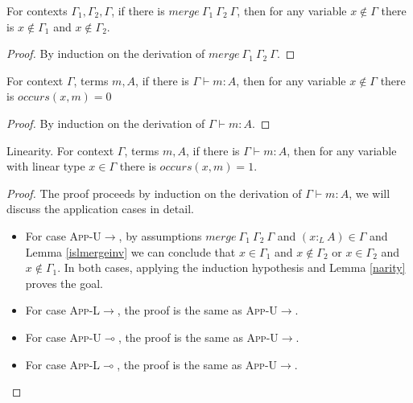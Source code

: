\documentclass[sigplan,screen,review,anonymous]{acmart}
\newcommand{\rname}[1]{\textsc{\footnotesize #1}}
\newcommand{\ltype}{:_{\scriptscriptstyle L}}
\newcommand{\mrg}[3]{merge\ {#1}\ {#2}\ {#3}}
\begin{document}
\begin{lemma}
  For contexts $\Gamma_1, \Gamma_2, \Gamma$, if there is $\mrg{\Gamma_1}{\Gamma_2}{\Gamma}$, then for any variable $x \notin \Gamma$ there is $x \notin \Gamma_1$ and $x \notin \Gamma_2$.
\end{lemma}
\begin{proof}
  By induction on the derivation of $\mrg{\Gamma_1}{\Gamma_2}{\Gamma}$.
\end{proof}

\begin{lemma}\label{narity}
  For context $\Gamma$, terms $m, A$, if there is $\Gamma \vdash m : A$, then for any variable $x \notin \Gamma$ there is $occurs(x, m) = 0$
\end{lemma}
\begin{proof}
  By induction on the derivation of $\Gamma \vdash m : A$.
\end{proof}

\begin{theorem}\label{linearity}
  Linearity. For context $\Gamma$, terms $m, A$, if there is $\Gamma \vdash m : A$, then for any variable with linear type $x \in \Gamma$ there is $occurs(x, m) = 1$.
\end{theorem}
\begin{proof}
  The proof proceeds by induction on the derivation of $\Gamma \vdash m : A$, we will discuss the application cases in detail.
  \begin{itemize}
    \item For case \rname{App-U$\rightarrow$}, by assumptions $\mrg{\Gamma_1}{\Gamma_2}{\Gamma}$ and $(x \ltype A) \in \Gamma$ and Lemma \ref{islmergeinv} we can conclude that $x \in \Gamma_1$ and $x \notin \Gamma_2$ or $x \in \Gamma_2$ and $x \notin \Gamma_1$. In both cases, applying the induction hypothesis and Lemma \ref{narity} proves the goal.
    \item For case \rname{App-L$\rightarrow$}, the proof is the same as \rname{App-U$\rightarrow$}.
    \item For case \rname{App-U$\multimap$}, the proof is the same as \rname{App-U$\rightarrow$}.
    \item For case \rname{App-L$\multimap$}, the proof is the same as \rname{App-U$\rightarrow$}.
  \end{itemize}
\end{proof}
\end{document}
